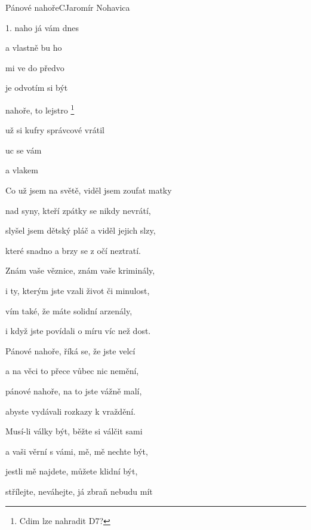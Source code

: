 \setcounter{page}{64}
\begin{song}{Pánové nahoře}{C}{Jaromír Nohavica}

\begin{SBVerse}

1.  naho já  vám dnes 

a  vlastně  bu ho 

 mi ve  do  předvo

je  odvotím  si  být 

 nahoře, to lejstro \footnote{Cdim lze nahradit D7?}

už  si kufry  správcové vrátil 

  uc se vám 

a  vlakem      
\end{SBVerse}

\begin{SBVerse}
Co už jsem na světě, viděl jsem zoufat matky

nad syny, kteří zpátky se nikdy nevrátí,

slyšel jsem dětský pláč a viděl jejich slzy,

které snadno a brzy se z očí neztratí.

Znám vaše věznice, znám vaše kriminály,

i ty, kterým jste vzali život či minulost,

vím také, že máte solidní arzenály,

i když jste povídali o míru víc než dost.
\end{SBVerse}

\begin{SBVerse}
Pánové nahoře, říká se, že jste velcí

a na věci to přece vůbec nic nemění,

pánové nahoře, na to jste vážně malí,

abyste vydávali rozkazy k vraždění.

Musí-li války být, běžte si válčit sami

a vaši věrní s vámi, mě, mě nechte být,

jestli mě najdete, můžete klidní být,

střílejte, neváhejte, já zbraň nebudu mít  
\end{SBVerse}

\end{song}

\pagebreak
